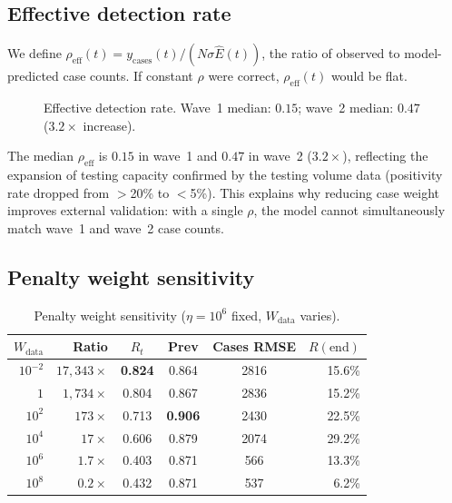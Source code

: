 \documentclass[11pt]{article}
\begin{document}
\subsection{Effective detection rate}\label{sec:results:detection}

We define $\rho_{\mathrm{eff}}(t) = y_{\mathrm{cases}}(t)/(N\sigma\hat{E}(t))$, the ratio of observed to model-predicted case counts. If constant $\rho$ were correct, $\rho_{\mathrm{eff}}(t)$ would be flat.

\begin{figure}[ht]
\centering
{}
\caption{Effective detection rate. Wave~1 median: $0.15$; wave~2 median: $0.47$ ($3.2\times$ increase).}\label{fig:detection}
\end{figure}

The median $\rho_{\mathrm{eff}}$ is $0.15$ in wave~1 and $0.47$ in wave~2 ($3.2\times$), reflecting the expansion of testing capacity confirmed by the testing volume data (positivity rate dropped from $>$20\% to $<$5\%). This explains why reducing case weight improves external validation: with a single $\rho$, the model cannot simultaneously match wave~1 and wave~2 case counts.

\subsection{Penalty weight sensitivity}\label{sec:results:sensitivity}

\begin{table}[ht]
\centering\small
\caption{Penalty weight sensitivity ($\eta=10^6$ fixed, $W_{\mathrm{data}}$ varies).}
\label{tab:wdata}
\begin{tabular}{rrcccr}
\toprule
$W_{\mathrm{data}}$ & Ratio & $R_t$ & Prev & Cases RMSE & $R(\text{end})$ \\
\midrule
$10^{-2}$ & $17{,}343\times$ & \textbf{0.824} & 0.864 & 2816 & 15.6\% \\
$1$ & $1{,}734\times$ & 0.804 & 0.867 & 2836 & 15.2\% \\
$10^{2}$ & $173\times$ & 0.713 & \textbf{0.906} & 2430 & 22.5\% \\
$10^{4}$ & $17\times$ & 0.606 & 0.879 & 2074 & 29.2\% \\
$10^{6}$ & $1.7\times$ & 0.403 & 0.871 & 566 & 13.3\% \\
$10^{8}$ & $0.2\times$ & 0.432 & 0.871 & 537 & 6.2\% \\
\bottomrule
\end{tabular}
\end{table}
\end{document}
